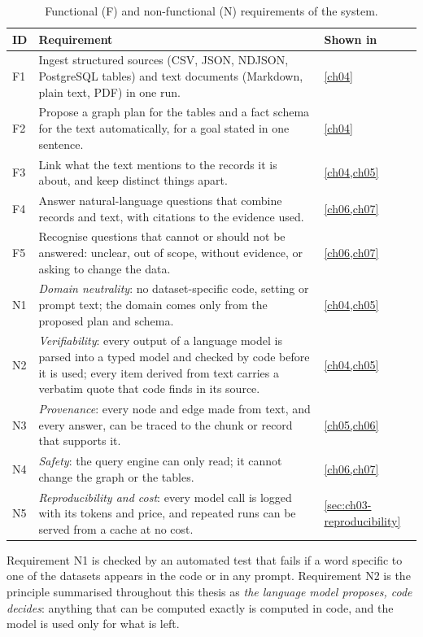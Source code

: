 \begin{table}[htbp]
\centering
\caption{Functional (F) and non-functional (N) requirements of the system.}
\label{tab:requirements}
\small
\begin{tabularx}{\linewidth}{@{}lXl@{}}
\toprule
ID & Requirement & Shown in \\
\midrule
F1 & Ingest structured sources (CSV, JSON, NDJSON, PostgreSQL tables) and text documents (Markdown, plain text, PDF) in one run. & \cref{ch04} \\
F2 & Propose a graph plan for the tables and a fact schema for the text automatically, for a goal stated in one sentence. & \cref{ch04} \\
F3 & Link what the text mentions to the records it is about, and keep distinct things apart. & \cref{ch04,ch05} \\
F4 & Answer natural-language questions that combine records and text, with citations to the evidence used. & \cref{ch06,ch07} \\
F5 & Recognise questions that cannot or should not be answered: unclear, out of scope, without evidence, or asking to change the data. & \cref{ch06,ch07} \\
\midrule
N1 & \emph{Domain neutrality}: no dataset-specific code, setting or prompt text; the domain comes only from the proposed plan and schema. & \cref{ch04,ch05} \\
N2 & \emph{Verifiability}: every output of a language model is parsed into a typed model and checked by code before it is used; every item derived from text carries a verbatim quote that code finds in its source. & \cref{ch04,ch05} \\
N3 & \emph{Provenance}: every node and edge made from text, and every answer, can be traced to the chunk or record that supports it. & \cref{ch05,ch06} \\
N4 & \emph{Safety}: the query engine can only read; it cannot change the graph or the tables. & \cref{ch06,ch07} \\
N5 & \emph{Reproducibility and cost}: every model call is logged with its tokens and price, and repeated runs can be served from a cache at no cost. & \cref{sec:ch03-reproducibility} \\
\bottomrule
\end{tabularx}
\end{table}

Requirement N1 is checked by an automated test that fails if a word specific to one of the datasets appears
in the code or in any prompt. Requirement N2 is the principle summarised throughout this thesis as
\emph{the language model proposes, code decides}: anything that can be computed exactly is computed in code,
and the model is used only for what is left.


